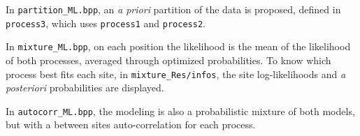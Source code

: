 \documentclass{article}
\begin{document}
In \verb#partition_ML.bpp#, an \textit{a priori} partition of the data
is proposed, defined in \verb#process3#, which uses \verb#process1#
and \verb#process2#.

In \verb#mixture_ML.bpp#, on each position the likelihood is the mean
of the likelihood of both processes, averaged through optimized
probabilities. To know which process best fits each site, in
\verb#mixture_Res/infos#, the site log-likelihoods and \textit{a
  posteriori} probabilities are displayed.

In \verb#autocorr_ML.bpp#, the modeling is also a probabilistic
mixture of both models, but with a between sites auto-correlation for
each process.




\end{document}
